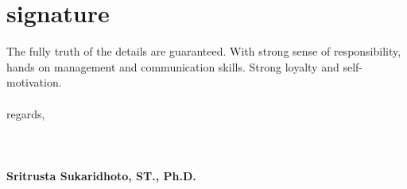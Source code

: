 \documentclass[style=verbose,maxnames=99,sorting=ydnt,style=verbose,maxnames=99,sorting=ydnt,backend=biber]{friggeri-cv} %
\begin{document}
\newrefcontext[sorting=ydnt]
\printbibliography[type=inproceedings, title={Conferences/Proceedings}, heading=subbibliography]


\pagebreak

\section{signature}

The fully truth of the details are guaranteed. With strong sense of responsibility, hands on management and communication skills. 
Strong loyalty and self-motivation. 
\\
\\ 
regards, 
\\ 
\\
\\
\\
\textbf{Sritrusta Sukaridhoto, ST., Ph.D.} 
\end{document}
